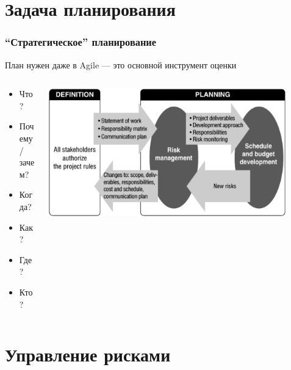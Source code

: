 \documentclass{../../slides-style}
\begin{document}
    \begin{frame}[plain]
        \titlepage
    \end{frame}

    \section{Задача планирования}

    \begin{frame}
        \frametitle{\enquote{Стратегическое} планирование}
        План нужен даже в Agile --- это основной инструмент оценки
        \begin{columns}
            \begin{column}{0.3\textwidth}
                \begin{itemize}
                    \item Что?
                    \item Почему/зачем?
                    \item Когда?
                    \item Как?
                    \item Где?
                    \item Кто?
                \end{itemize}
            \end{column}
            \begin{column}{0.7\textwidth}
                \begin{center}
                    \includegraphics[width=0.9\textwidth]{planning.png}
                \end{center}
            \end{column}
        \end{columns}
    \end{frame}

    \section{Управление рисками}
\end{document}
